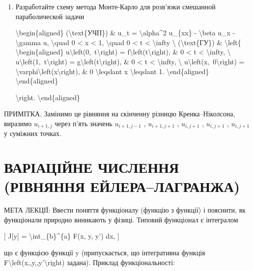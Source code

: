 \documentclass[
]{article}
\begin{document}
{{{\begin{enumerate}
\def\labelenumi{\arabic{enumi}.}
\setcounter{enumi}{4}
\item
  Разработайте схему метода Монте-Карло для розв'язки смешанной
  параболической задачи

  \textbackslash begin\{aligned\} (\textbackslash text\{УЧП\}) \& u\_t =
  \textbackslash alpha\^{}2 u\_\{xx\} - \textbackslash beta u\_x -
  \textbackslash gamma u, \textbackslash quad 0 \textless{} x
  \textless{} 1, \textbackslash quad 0 \textless{} t \textless{}
  \textbackslash infty \textbackslash{} (\textbackslash text\{ГУ\}) \&
  \textbackslash left\{ \textbackslash begin\{aligned\}
  u\textbackslash left(0,~t\textbackslash right) =
  f\textbackslash left(t\textbackslash right), \& 0 \textless{} t
  \textless{} \textbackslash infty, \textbackslash{}
  u\textbackslash left(1,~t\textbackslash right) =
  g\textbackslash left(t\textbackslash right), \& 0 \textless{} t
  \textless{} \textbackslash infty, \textbackslash{}
  u\textbackslash left(x,~0\textbackslash right) =
  \textbackslash varphi\textbackslash left(x\textbackslash right), \& 0
  \textbackslash leqslant x \textbackslash leqslant 1.
  \textbackslash end\{aligned\} \textbackslash end\{aligned\}

  \textbackslash right. \textbackslash end\{aligned\}
\end{enumerate}

ПРИМІТКА. Замінимо це рівняння на скінченну різницю Кренка--Ніколсона,
виразимо \(u_{i+1,j}\) через п'ять значень \(u_{i+1,j-1}\) ,
\(u_{i+1,j+1}\) , \(u_{i,j+1}\) , \(u_{i,j+1}\) , \(u_{i,j+1}\) у
суміжних точках.

\section{ВАРІАЦІЙНЕ ЧИСЛЕННЯ (РІВНЯННЯ
ЕЙЛЕРА--ЛАГРАНЖА)}\label{ux432ux430ux440ux456ux430ux446ux456ux439ux43dux435-ux447ux438ux441ux43bux435ux43dux43dux44f-ux440ux456ux432ux43dux44fux43dux43dux44f-ux435ux439ux43bux435ux440ux430ux43bux430ux433ux440ux430ux43dux436ux430}

МЕТА ЛЕКЦІЇ: Ввести поняття функціоналу (функцію з функції) і пояснити,
як функціонали природно виникають у фізиці. Типовий функціонал є
інтегралом

{[} J{[}y{]} = \textbackslash int\_\{b\}\^{}\{a\} F(x, y, y') dx, {]}

що є функцією функції y (припускається, що інтегративна функція
F\textbackslash left(x,,y,,y'\textbackslash right) задана). Приклад
функціональності:

}}}
\end{document}
